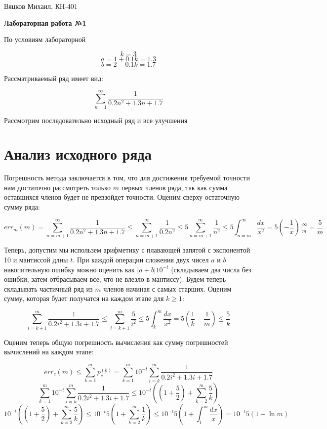 \documentclass[11pt,a4paper,oneside]{article}
\begin{document}
\begin{center}
	{Вяцков Михаил, КН-401}
	
	{\huge \bf Лабораторная работа №1}
\end{center}

По условиям лабораторной

$$ k = 3 $$
$$ a = 1 + 0.1 k = 1.3 $$
$$ b = 2 - 0.1 k = 1.7 $$

Рассматриваемый ряд имеет вид:

$$ \sum_{n = 1}^{\infty} \frac{1}{0.2n^2 + 1.3n + 1.7} $$

Рассмотрим последовательно исходный ряд и все улучшения

\section{Анализ исходного ряда}

Погрешность метода заключается в том, что для достижения требуемой точности нам достаточно рассмотреть только $m$ первых членов ряда, так как сумма оставшихся членов будет не превзойдет точности. Оценим сверху остаточную сумму ряда:

$$ err_{m}(m) = \sum_{n = m + 1}^{\infty} \frac{1}{0.2n^2 + 1.3n + 1.7} 
	\le \sum_{n = m + 1}^{\infty} \frac{1}{0.2n^2}
	\le 5 \sum_{n = m + 1}^{\infty} \frac{1}{n^2}
	\le 5 \int_{n = m}^{\infty} \frac{dx}{x^2}
	= 5 (- \frac{1}{x})\biggr|_{m}^{\infty}
	= \frac{5}{m}$$
	
Теперь, допустим мы использем арифметику с плавающей запятой с экспонентой 10 и мантиссой длны $t$. При каждой операции сложения двух чисел $a$ и $b$ накопительную ошибку можно оценить как $|a + b| 10^{-t}$ (складываем два числа без ошибки, затем отбрасываем все, что не влезло в мантиссу). Будем теперь складывать частичный ряд из $m$ членов начиная с самых старших. Оценим сумму, которая будет получатся на каждом этапе для $k \ge 1$:

$$ \sum_{i = k + 1}^{m} \frac{1}{0.2i^2 + 1.3i + 1.7}
	\le \sum_{i = k + 1}^{m} \frac{5}{i^2}
	\le 5 \int_{k}^{m} \frac{dx}{x^2}
	= 5(\frac{1}{k} - \frac{1}{m})
	\le \frac{5}{k} $$
	
Оценим теперь общую погрешность вычисления как сумму погрешностей вычислений на каждом этапе:

$$ err_{c}(m)
	\le \sum_{k = 1}^{m} p_{c}^{(k)}
	= \sum_{k = 1}^{m} 10^{-t} \sum_{i = k}^{m} \frac{1}{0.2i^2 + 1.3i + 1.7}$$
$$ \sum_{k = 1}^{m} 10^{-t} \sum_{i = k}^{m} \frac{1}{0.2i^2 + 1.3i + 1.7}
	\le 10^{-t} ((1 + \frac{5}{2}) + \sum_{k = 2}^{m} \frac{5}{k})$$
$$ 10^{-t} ((1 + \frac{5}{2}) + \sum_{k = 2}^{m} \frac{5}{k})
	\le 10^{-t} 5 (1 + \sum_{k = 2}^{m} \frac{1}{k})
	\le 10^{-t} 5 (1 + \int_{1}^{m} \frac{dx}{x})
	= 10^{-t} 5 (1 + \ln m) $$
	
\end{document}
